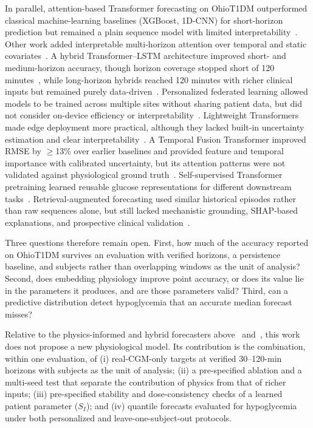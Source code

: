 \documentclass[journal]{IEEEtran}
\begin{document}
In parallel, attention-based Transformer forecasting on OhioT1DM outperformed classical machine-learning baselines (XGBoost, 1D-CNN) for short-horizon prediction but remained a plain sequence model with limited interpretability~\cite{ref19}. Other work added interpretable multi-horizon attention over temporal and static covariates~\cite{ref20}. A hybrid Transformer--LSTM architecture improved short- and medium-horizon accuracy, though horizon coverage stopped short of 120 minutes~\cite{ref21}, while long-horizon hybrids reached 120 minutes with richer clinical inputs but remained purely data-driven~\cite{ref22}. Personalized federated learning allowed models to be trained across multiple sites without sharing patient data, but did not consider on-device efficiency or interpretability~\cite{ref24}. Lightweight Transformers made edge deployment more practical, although they lacked built-in uncertainty estimation and clear interpretability~\cite{ref25}. A Temporal Fusion Transformer improved RMSE by $\geq$13\% over earlier baselines and provided feature and temporal importance with calibrated uncertainty, but its attention patterns were not validated against physiological ground truth~\cite{ref26}. Self-supervised Transformer pretraining learned reusable glucose representations for different downstream tasks~\cite{ref27}. Retrieval-augmented forecasting used similar historical episodes rather than raw sequences alone, but still lacked mechanistic grounding, SHAP-based explanations, and prospective clinical validation~\cite{ref29}.


Three questions therefore remain open. First, how much of the accuracy reported on OhioT1DM survives an evaluation with verified horizons, a persistence baseline, and subjects rather than overlapping windows as the unit of analysis? Second, does embedding physiology improve point accuracy, or does its value lie in the parameters it produces, and are those parameters valid? Third, can a predictive distribution detect hypoglycemia that an accurate median forecast misses?

Relative to the physics-informed and hybrid forecasters above~\cite{ref9,ref11,ref12} and~\cite{ref58}, this work does not propose a new physiological model. Its contribution is the combination, within one evaluation, of (i) real-CGM-only targets at verified 30--120-min horizons with subjects as the unit of analysis; (ii) a pre-specified ablation and a multi-seed test that separate the contribution of physics from that of richer inputs; (iii) pre-specified stability and dose-consistency checks of a learned patient parameter ($S_I$); and (iv) quantile forecasts evaluated for hypoglycemia under both personalized and leave-one-subject-out protocols.
\end{document}
